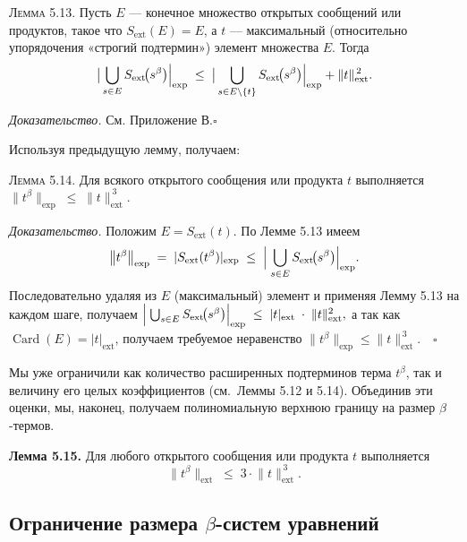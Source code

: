 \textsc{Лемма 5.13.}
Пусть $E$ — конечное множество открытых сообщений или продуктов,
такое что $S_{\text{ext}}(E)=E$, а $t$ — максимальный
(относительно упорядочения «строгий подтермин»)
элемент множества $E$.
Тогда
\[
  \bigl\lvert\,
        \bigcup_{s\in E} S_{\text{ext}}\!\bigl(s^{\beta}\bigr)
        \Bigr{\rvert}_{\text{exp}}
  \;\le\;
  \bigl\lvert\,
        \bigcup_{s\in E\setminus\{t\}}
            S_{\text{ext}}\!\bigl(s^{\beta}\bigr)
            \Bigr{\rvert}_{\text{exp}}
  +\lVert t\rVert_{\text{ext}}^{\,2}.
\]

\textit{Доказательство.} См. Приложение В.\hfill$\square$

Используя предыдущую лемму, получаем:

\textsc{Лемма 5.14.}\;
Для всякого открытого сообщения или продукта $t$ выполняется
\(
   \bigl\lVert t^{\beta}\bigr\rVert_{\text{exp}}
   \;\le\;
   \lVert t\rVert_{\text{ext}}^{\,3}.
\)

\textit{Доказательство.}
Положим $E = S_{\text{ext}}(t)$.
По Лемме 5.13 имеем
\[
   \bigl\lVert t^{\beta}\bigr\rVert_{\text{exp}}
   \;=\;
   \lvert S_{\text{ext}}(t^{\beta})\rvert_{\text{exp}}
   \;\le\;
   \Bigl\lvert\;
       \bigcup_{s\in E} S_{\text{ext}}\!\bigl(s^{\beta}\bigr)
   \Bigr\rvert_{\text{exp}} .
\]
Последовательно удаляя из $E$ (максимальный) элемент
и применяя Лемму 5.13 на каждом шаге,
получаем
\(
   \Bigl\lvert\;
       \bigcup_{s\in E} S_{\text{ext}}\!\bigl(s^{\beta}\bigr)
   \Bigr\rvert_{\text{exp}}
   \;\le\;
   \lvert t\rvert_{\text{ext}}\;\cdot\;\lVert t\rVert_{\text{ext}}^2 ,
\)
а так как $\operatorname{Card}(E)=\lvert t\rvert_{\text{ext}}$,
получаем требуемое неравенство
\(
   \lVert t^{\beta}\rVert_{\text{exp}}
   \le
   \lVert t\rVert_{\text{ext}}^{\,3}.
\quad\square
\)

Мы уже ограничили как количество расширенных подтерминов терма $t^{\beta}$,
так и величину его целых коэффициентов (см.~Леммы 5.12 и 5.14).
Объединив эти оценки, мы, наконец, получаем полиномиальную верхнюю
границу на размер $\beta$-термов.

\textbf{Лемма 5.15.}\;
Для любого открытого сообщения или продукта $t$ выполняется
\[
      \bigl\lVert t^{\beta}\bigr\rVert_{\text{ext}}
      \;\le\;
      3\cdot\lVert t\rVert_{\text{ext}}^{\,3}.
\]

\subsection{Ограничение размера $\beta$-систем уравнений}

